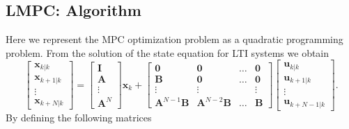 \documentclass{article}
\begin{document}
\subsection{LMPC: Algorithm}
Here we represent the MPC  optimization problem as a quadratic programming problem. 
From the solution of the state equation for LTI systems  we obtain
 \begin{equation}
 \left[\begin{matrix}
\textbf{x}_{k|k}\\\textbf{x}_{k+1|k}\\\vdots\\ \textbf{x}_{k+{N}|k}
\end{matrix}\right]=    \left[\begin{matrix}
\textbf{I}\\\textbf{A}\\ \vdots \\ \textbf{A}^{{N}} 
\end{matrix}\right] \textbf{x}_{k}+ \left[\begin{matrix}
\textbf{0} & \textbf{0}  & \dots &\textbf{0}  \\\textbf{B}& \textbf{0}  & \dots &\textbf{0}\\ \vdots & \vdots& & \vdots\\ \textbf{A}^{{N}-1}\textbf{B} & \textbf{A}^{{N}-2}\textbf{B}  & \dots &\textbf{B}   
\end{matrix}\right]\left[\begin{matrix}
\textbf{u}_{k|k}\\\textbf{u}_{k+1|k}\\\vdots\\ \textbf{u}_{k+{N}-1|k}
\end{matrix}\right].
\end{equation}
By defining the following matrices  
\end{document}
